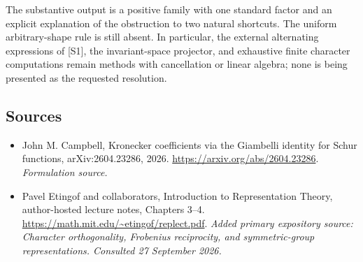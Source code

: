 \documentclass[11pt]{article}
\begin{document}
The substantive output is a positive family with one standard factor and an explicit explanation of the obstruction to two natural shortcuts. The uniform arbitrary-shape rule is still absent. In particular, the external alternating expressions of [S1], the invariant-space projector, and exhaustive finite character computations remain methods with cancellation or linear algebra; none is being presented as the requested resolution.

\subsection{Sources}
\begin{itemize}
\item[S1]John M. Campbell, Kronecker coefficients via the Giambelli identity for Schur functions, arXiv:2604.23286, 2026.
\url{https://arxiv.org/abs/2604.23286}.
\textit{Formulation source.}
\item[E1]Pavel Etingof and collaborators, Introduction to Representation Theory, author-hosted lecture notes, Chapters 3--4.
\url{https://math.mit.edu/~etingof/replect.pdf}.
\textit{Added primary expository source: Character orthogonality, Frobenius reciprocity, and symmetric-group representations. Consulted 27 September 2026.}
\end{itemize}
\end{document}
